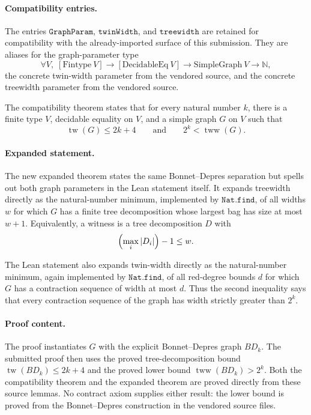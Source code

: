 \paragraph{Compatibility entries.}
The entries \(\texttt{GraphParam}\), \(\texttt{twinWidth}\), and
\(\texttt{treewidth}\) are retained for compatibility with the already-imported
surface of this submission.  They are aliases for the graph-parameter type
\[
  \forall V,\; [\mathrm{Fintype}\ V] \to [\mathrm{DecidableEq}\ V] \to
    \mathrm{SimpleGraph}\ V \to \mathbb{N},
\]
the concrete twin-width parameter from the vendored source, and the concrete
treewidth parameter from the vendored source.

The compatibility theorem states that for every natural number \(k\), there is
a finite type \(V\), decidable equality on \(V\), and a simple graph \(G\) on
\(V\) such that
\[
  \operatorname{tw}(G) \le 2k+4
  \qquad\text{and}\qquad
  2^k < \operatorname{tww}(G).
\]

\paragraph{Expanded statement.}
The new expanded theorem states the same Bonnet--Depres separation but spells
out both graph parameters in the Lean statement itself.  It expands treewidth
directly as the natural-number minimum, implemented by \(\texttt{Nat.find}\),
of all widths \(w\) for which \(G\) has a finite tree decomposition whose
largest bag has size at most \(w+1\).  Equivalently, a witness is a tree
decomposition \(D\) with
\[
  \Bigl(\max_i |D_i|\Bigr)-1 \le w .
\]

The Lean statement also expands twin-width directly as the natural-number
minimum, again implemented by \(\texttt{Nat.find}\), of all red-degree bounds \(d\) for
which \(G\) has a contraction sequence of width at most \(d\).  Thus the
second inequality says that every contraction sequence of the graph has width
strictly greater than \(2^k\).

\paragraph{Proof content.}
The proof instantiates \(G\) with the explicit Bonnet--Depres graph
\(BD_k\).  The submitted proof then uses the proved tree-decomposition bound
\(\operatorname{tw}(BD_k) \le 2k+4\) and the proved lower bound
\(\operatorname{tww}(BD_k) > 2^k\).  Both the compatibility theorem and the
expanded theorem are proved directly from these source lemmas.  No contract
axiom supplies either result: the lower bound is proved from the
Bonnet--Depres construction in the vendored source files.

